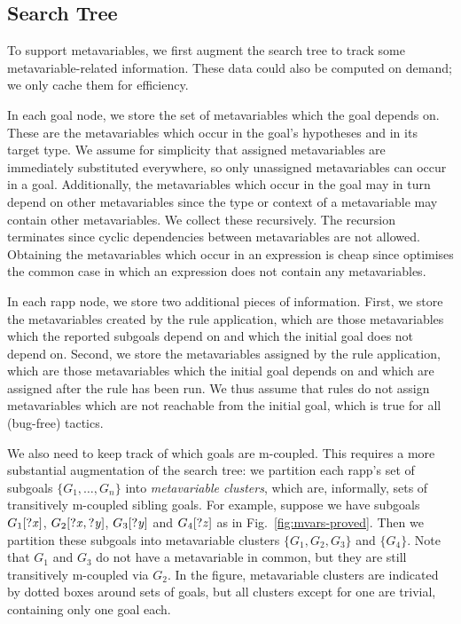 \subsection{Search Tree}%
\label{sec:mvars-search-tree}

To support metavariables, we first augment the search tree to track some metavariable-related information.
These data could also be computed on demand; we only cache them for efficiency.

In each goal node, we store the set of metavariables which the goal depends on.
These are the metavariables which occur in the goal's hypotheses and in its target type.
We assume for simplicity that assigned metavariables are immediately substituted everywhere, so only unassigned metavariables can occur in a goal.
Additionally, the metavariables which occur in the goal may in turn depend on other metavariables since the type or context of a metavariable may contain other metavariables.
We collect these recursively.
The recursion terminates since cyclic dependencies between metavariables are not allowed.
Obtaining the metavariables which occur in an expression is cheap since \Lean{} optimises the common case in which an expression does not contain any metavariables.

In each rapp node, we store two additional pieces of information.
First, we store the metavariables created by the rule application, which are those metavariables which the reported subgoals depend on and which the initial goal does not depend on.
Second, we store the metavariables assigned by the rule application, which are those metavariables which the initial goal depends on and which are assigned after the rule has been run.
We thus assume that rules do not assign metavariables which are not reachable from the initial goal, which is true for all (bug-free) \Lean{} tactics.

We also need to keep track of which goals are m-coupled.
This requires a more substantial augmentation of the search tree: we partition each rapp's set of subgoals $\{ G_{1}, \dots, G_{n} \}$ into \emph{metavariable clusters}, which are, informally, sets of transitively m-coupled sibling goals.
For example, suppose we have subgoals $G_{1}[\mathit{?x}]$, $G_{2}[\mathit{?x}, \mathit{?y}]$, $G_{3}[\mathit{?y}]$ and $G_{4}[\mathit{?z}]$ as in Fig.~\ref{fig:mvars-proved}.
Then we partition these subgoals into metavariable clusters $\{ G_{1}, G_{2}, G_{3} \}$ and $\{ G_{4} \}$.
Note that $G_{1}$ and $G_{3}$ do not have a metavariable in common, but they are still transitively m-coupled via $G_{2}$.
In the figure, metavariable clusters are indicated by dotted boxes around sets of goals, but all clusters except for one are trivial, containing only one goal each.

